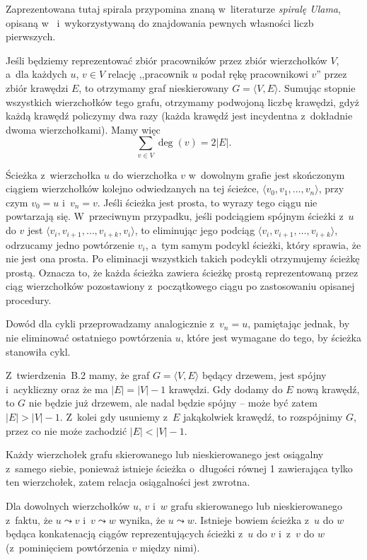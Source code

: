 Zaprezentowana tutaj spirala przypomina znaną w~literaturze \emph{spiralę Ulama}, opisaną w~\cite{ulamspiral} i~wykorzystywaną do znajdowania pewnych własności liczb pierwszych.


\exercise %
Jeśli będziemy reprezentować zbiór pracowników przez zbiór wierzchołków $V$, a~dla każdych $u$, $v\in V$ relację ,,pracownik $u$ podał rękę pracownikowi $v$'' przez zbiór krawędzi $E$, to otrzymamy graf nieskierowany $G=\langle V,E\rangle$. Sumując stopnie wszystkich wierzchołków tego grafu, otrzymamy podwojoną liczbę krawędzi, gdyż każdą krawędź policzymy dwa razy (każda krawędź jest incydentna z~dokładnie dwoma wierzchołkami). Mamy więc
\[
	\sum_{v\in V}\deg(v) = 2|E|.
\]

\exercise %
Ścieżka z~wierzchołka $u$ do wierzchołka $v$ w~dowolnym grafie jest skończonym ciągiem wierzchołków kolejno odwiedzanych na tej ścieżce, $\langle v_0,v_1,\dots,v_n\rangle$, przy czym $v_0=u$ i~$v_n=v$. Jeśli ścieżka jest prosta, to wyrazy tego ciągu nie powtarzają się. W~przeciwnym przypadku, jeśli podciągiem spójnym ścieżki z~$u$ do $v$ jest $\langle v_i,v_{i+1},\dots,v_{i+k},v_i\rangle$, to eliminując jego podciąg $\langle v_i,v_{i+1},\dots,v_{i+k}\rangle$, odrzucamy jedno powtórzenie $v_i$, a~tym samym podcykl ścieżki, który sprawia, że nie jest ona prosta. Po eliminacji wszystkich takich podcykli otrzymujemy ścieżkę prostą. Oznacza to, że każda ścieżka zawiera ścieżkę prostą reprezentowaną przez ciąg wierzchołków pozostawiony z~początkowego ciągu po zastosowaniu opisanej procedury.

Dowód dla cykli przeprowadzamy analogicznie z~$v_n=u$, pamiętając jednak, by nie eliminować ostatniego powtórzenia $u$, które jest wymagane do tego, by ścieżka stanowiła cykl.

\exercise %
Z~twierdzenia~B.2 mamy, że graf $G=\langle V,E\rangle$ będący drzewem, jest spójny i~acykliczny oraz że ma $|E|=|V|-1$ krawędzi. Gdy dodamy do $E$ nową krawędź, to $G$ nie będzie już drzewem, ale nadal będzie spójny -- może być zatem $|E|>|V|-1$. Z~kolei gdy usuniemy z~$E$ jakąkolwiek krawędź, to rozspójnimy $G$, przez co nie może zachodzić $|E|<|V|-1$.

\exercise %
Każdy wierzchołek grafu skierowanego lub nieskierowanego jest osiągalny z~samego siebie, ponieważ istnieje ścieżka o~długości równej 1 zawierająca tylko ten wierzchołek, zatem relacja osiągalności jest zwrotna.

Dla dowolnych wierzchołków $u$, $v$ i~$w$ grafu skierowanego lub nieskierowanego z~faktu, że $u\leadsto v$ i~$v\leadsto w$ wynika, że $u\leadsto w$. Istnieje bowiem ścieżka z~$u$ do $w$ będąca konkatenacją ciągów reprezentujących ścieżki z~$u$ do $v$ i~z~$v$ do $w$ (z~pominięciem powtórzenia $v$ między nimi).

